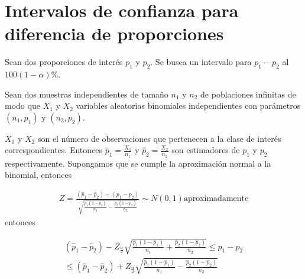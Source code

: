 \section{Intervalos de confianza para diferencia de proporciones}





Sean dos proporciones de inter\'es $p_{1}$ y $p_{2}$. Se busca un intervalo para $p_{1}-p_{2}$ al $100\left(1-\alpha\right)\%$.\medskip

Sean dos muestras independientes de tama\~no $n_{1}$ y $n_{2}$ de poblaciones infinitas de modo que $X_{1}$ y $X_{2}$ variables aleatorias binomiales independientes con par\'ametros $\left(n_{1},p_{1}\right)$ y $\left(n_{2},p_{2}\right)$.\medskip

$X_{1}$ y $X_{2}$ son  el n\'umero de observaciones que pertenecen a la clase de inter\'es correspondientes. Entonces $\hat{p}_{1}=\frac{X_{1}}{n_{1}}$ y $\hat{p}_{2}=\frac{X_{2}}{n_{2}}$ son estimadores de $p_{1}$ y $p_{2}$ respectivamente. Supongamos que se cumple la aproximaci\'on  normal a la binomial, entonces




\begin{eqnarray*}
Z=\frac{\left(\hat{p}_{1}-\hat{p}_{2}\right)-\left(p_{1}-p_{2}\right)}{\sqrt{\frac{p_{1}\left(1-p_{1}\right)}{n_{1}}-\frac{p_{2}\left(1-p_{2}\right)}{n_{2}}}}\sim N\left(0,1\right)\textrm{aproximadamente}
\end{eqnarray*}
entonces

\begin{eqnarray*}
\left(\hat{p}_{1}-\hat{p}_{2}\right)-Z_{\frac{\alpha}{2}}\sqrt{\frac{\hat{p}_{1}\left(1-\hat{p}_{1}\right)}{n_{1}}+\frac{\hat{p}_{2}\left(1-\hat{p}_{2}\right)}{n_{2}}}\leq p_{1}-p_{2}\\
\leq\left(\hat{p}_{1}-\hat{p}_{2}\right)+Z_{\frac{\alpha}{2}}\sqrt{\frac{\hat{p}_{1}\left(1-\hat{p}_{1}\right)}{n_{1}}-\frac{\hat{p}_{2}\left(1-\hat{p}_{2}\right)}{n_{2}}}
\end{eqnarray*}





